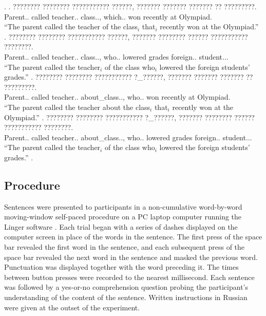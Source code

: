 \documentclass[12pt]{article}
\begin{document}
\ex. 
\ag. ???????? ???????? ??????????? ??????, ??????? ??????? ??????? ?? ?????????.\\
 {Parent.\masc.\nom} called {teacher.\fem.\dat} {class.\masc.\gen}, {which.\masc.\nom} won recently at Olympiad.\\
``The parent called the teacher of the class$_i$ that$_i$ recently won at the Olympiad.''
\bg. ???????? ???????? ??????????? ??????, ??????? ???????? ?????? ??????????? ????????.       \\
 {Parent.\masc.\nom} called {teacher.\fem.\dat} {class.\masc.\gen}, {who.\fem.\nom} lowered grades {foreign.\pl.\dat} {student.\pl.\dat}.\\
``The parent called the teacher$_i$ of the class who$_i$ lowered the foreign students' grades.''
\cg. ???????? ???????? ??????????? ?\_??????, ??????? ??????? ??????? ?? ?????????.\\
 {Parent.\masc.\nom} called {teacher.\fem.\dat} {about\_class.\masc.\prep}, {who.\masc.\nom} won recently at Olympiad.\\
``The parent called the teacher about the class$_i$ that$_i$ recently won at the Olympiad.''
\dg. ???????? ???????? ??????????? ?\_??????, ??????? ???????? ?????? ??????????? ????????. \\
 {Parent.\masc.\nom} called {teacher.\fem.\dat} {about\_class.\masc.\gen}, {who.\fem.\nom} lowered grades {foreign.\pl.\dat} {student.\pl.\dat}.\\
``The parent called the teacher$_i$ of the class who$_i$ lowered the foreign students' grades.''
\z.



\subsection{Procedure}
\label{sec:procedure}


Sentences were presented to participants in a non-cumulative
word-by-word moving-window self-paced procedure on a PC laptop
computer running the Linger software \citep{rohde:lingermanual}. Each
trial began with a series of dashes displayed on the computer screen
in place of the words in the sentence. The first press of the space
bar revealed the first word in the sentence, and each subsequent press
of the space bar revealed the next word in the sentence and masked the
previous word. Punctuation was displayed together with the word
preceding it.  The times between button presses were recorded to the
nearest millisecond.  Each sentence was followed by a yes-or-no
comprehension question probing the participant's understanding of the
content of the sentence.  Written instructions in Russian were given
at the outset of the experiment.
\end{document}
